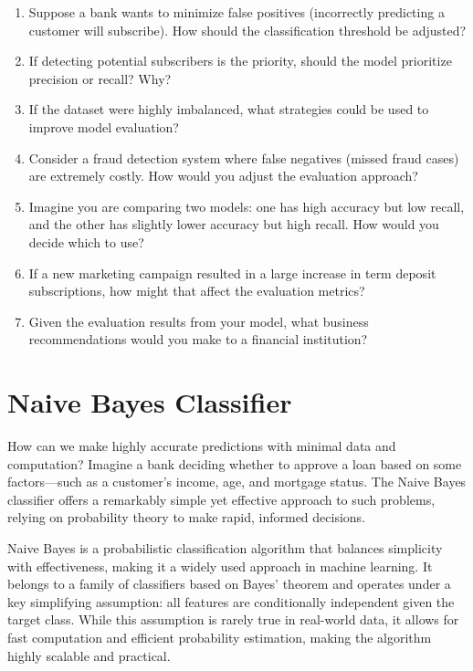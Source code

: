 \documentclass[
]{book}
\providecommand{\tightlist}{%
  \setlength{\itemsep}{0pt}\setlength{\parskip}{0pt}}
\theoremstyle{definition}
\theoremstyle{definition}
\theoremstyle{definition}
\theoremstyle{definition}
\theoremstyle{remark}
\begin{document}
\begin{enumerate}
\def\labelenumi{\arabic{enumi}.}
\setcounter{enumi}{35}
\tightlist
\item
  Suppose a bank wants to minimize false positives (incorrectly predicting a customer will subscribe). How should the classification threshold be adjusted?\\
\item
  If detecting potential subscribers is the priority, should the model prioritize precision or recall? Why?\\
\item
  If the dataset were highly imbalanced, what strategies could be used to improve model evaluation?\\
\item
  Consider a fraud detection system where false negatives (missed fraud cases) are extremely costly. How would you adjust the evaluation approach?\\
\item
  Imagine you are comparing two models: one has high accuracy but low recall, and the other has slightly lower accuracy but high recall. How would you decide which to use?\\
\item
  If a new marketing campaign resulted in a large increase in term deposit subscriptions, how might that affect the evaluation metrics?\\
\item
  Given the evaluation results from your model, what business recommendations would you make to a financial institution?
\end{enumerate}

\chapter{Naive Bayes Classifier}\label{chapter-bayes}

How can we make highly accurate predictions with minimal data and computation? Imagine a bank deciding whether to approve a loan based on some factors---such as a customer's income, age, and mortgage status. The Naive Bayes classifier offers a remarkably simple yet effective approach to such problems, relying on probability theory to make rapid, informed decisions.

Naive Bayes is a probabilistic classification algorithm that balances simplicity with effectiveness, making it a widely used approach in machine learning. It belongs to a family of classifiers based on Bayes' theorem and operates under a key simplifying assumption: all features are conditionally independent given the target class. While this assumption is rarely true in real-world data, it allows for fast computation and efficient probability estimation, making the algorithm highly scalable and practical.
\end{document}
